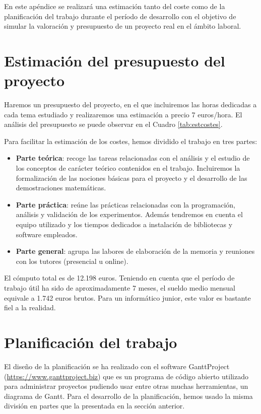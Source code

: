 En este apéndice se realizará una estimación tanto del coste como de la planificación del trabajo durante el período de desarrollo con el objetivo de simular la valoración y presupuesto de un proyecto real en el ámbito laboral.

\section*{Estimación del presupuesto del proyecto}

Haremos un presupuesto del proyecto, en el que incluiremos las horas dedicadas a cada tema estudiado y realizaremos una estimación a precio 7 euros/hora. El análisis del presupuesto se puede observar en el Cuadro \ref{tab:estcostes}.

Para facilitar la estimación de los costes, hemos dividido el trabajo en tres partes:

\begin{itemize}
    \item \textbf{Parte teórica}: recoge las tareas relacionadas con el análisis y el estudio de los conceptos de carácter teórico contenidos en el trabajo. Incluiremos la formalización de las nociones básicas para el proyecto y el desarrollo de las demostraciones matemáticas.
    \item \textbf{Parte práctica}: reúne las prácticas relacionadas con la programación, análisis y validación de los experimentos. Además tendremos en cuenta el equipo utilizado y los tiempos dedicados a instalación de bibliotecas y software empleados.
    \item \textbf{Parte general}: agrupa las labores de elaboración de la memoria y reuniones con los tutores (presencial u online).
\end{itemize}

El cómputo total es de 12.198 euros. Teniendo en cuenta que el período de trabajo útil ha sido de aproximadamente 7 meses, el sueldo medio mensual equivale a 1.742 euros brutos. Para un informático junior, este valor es bastante fiel a la realidad.

\section*{Planificación del trabajo}

El diseño de la planificación se ha realizado con el software GanttProject (\url{https://www.ganttproject.biz}) que es un programa de código abierto utilizado para administrar proyectos pudiendo usar entre otras muchas herramientas, un diagrama de Gantt. Para el desarrollo de la planificación, hemos usado la misma división en partes que la presentada en la sección anterior.


